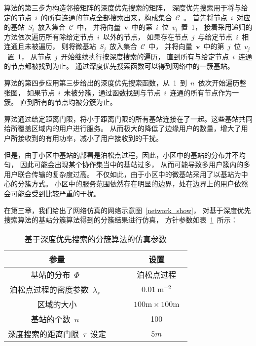 算法的第三步为构造邻接矩阵的深度优先搜索的矩阵，
深度优先搜索用于将与给定的节点~$i$~的所有连通的节点全部搜索出来，构成集合~$\mathcal{C}$~。
首先将节点~$i$~对应的基站~$S_i$~放入集合~$\mathcal{C}$~中，
并将向量~$\mathbf{v}$~中的第~$i$~位~$v_i$~置~1，
接着采用递归的方法依次遍历所有除给定节点~$i$~以外的节点，
如果存在节点~$j$~与给定节点~$i$~相连通且未被遍历，
则将微基站~$S_j$~放入集合~$\mathcal{C}$~中，
并将向量~$\mathbf{v}$~中的第~$j$~位~$v_j$~置~1，
从节点~$j$~开始继续执行按深度搜索的遍历，
直到所有与给定节点~$i$~连通的节点都被找到为止。
通过深度优先搜索函数可以得到网络中的一簇基站。

算法的第四步应用第三步给出的深度优先搜索函数，从~1~到~$n$~依次开始遍历整张图，
如果节点~$i$~未被分簇，通过函数找到与节点~$i$~连通的所有节点作为一簇。
直到所有的节点均被分簇为止。


算法通过给定距离门限，将小于距离门限的所有基站连接在了一起。这些基站共同给所覆盖区域内的用户进行服务。
从而极大的降低了边缘用户的数量，增大了用户所接收到的有用功率，减小了用户接收到的干扰。

但是，由于小区中基站的部署是泊松点过程，因此，小区中的基站的分布并不均匀，
因此可能会出现某个协作集当中的基站过多，
从而可能导致多用户簇内的多用户联合传输的复杂度过高。
不仅如此，由于小区中的微基站采用了以基站为中心的分簇方式。
小区中的服务范围依然存在明显的边界，处在边界上的用户依然会可能会受到比较严重的干扰。




在第三章，我们给出了网络仿真的网络示意图~\ref{network_show}，
对基于深度优先搜索算法的基站分簇算法得到的分簇结果进行仿真，
方针参数如表~\ref{dfs_show_sim_para}~所示：

\begin{table}[htbp]
\caption{基于深度优先搜索的分簇算法的仿真参数}
\label{dfs_show_sim_para}
\vspace{0.5em}\centering\wuhao
\begin{tabular}{cccc}
\toprule[1.5pt]
参量 & & & 设置 \\
\midrule[0.5pt]
基站的分布~$\Phi$~ & & & 泊松点过程 \\
泊松点过程的密度参数~$\lambda_s$~ & & & ~$0.01~\mathrm{m}^{-2}$~ \\
区域的大小  & & & ~$100\mathrm{m} \times 100 \mathrm{m}$~ \\
基站的个数~$n$~  & & & 100\\
深度搜索的距离门限~$\tau$~设定 & & & ~$5m$~\\
\bottomrule[1.5pt]
\end{tabular}
\end{table}

